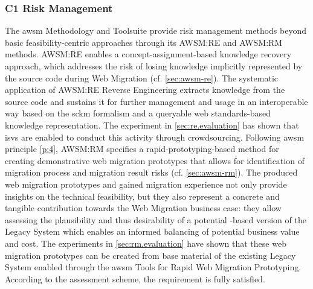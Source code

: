 \vspace{-10pt}
\subsubsection*{C1 Risk Management}
The \gls{awsm} Methodology and Toolsuite provide \gls{risk management} methods beyond basic feasibility-centric approaches through its AWSM:RE and AWSM:RM methods.
AWSM:RE enables a concept-assignment-based knowledge recovery approach, which addresses the risk of losing knowledge implicitly represented by the  source code during \gls{Web Migration} (cf. \cref{sec:awsm-re}).
The systematic application of AWSM:RE \gls{Reverse Engineering} extracts knowledge from the source code and sustains it for further management and usage in an interoperable way based on the \gls{sckm} formalism and a queryable \gls{web} standards-based knowledge representation.
The experiment in \cref{sec:re.evaluation} has shown that \glspl{isv} are enabled to conduct this activity through crowdsourcing.
Following \gls{awsm} principle \cref{p:4}, AWSM:RM specifies a rapid-prototyping-based method for creating demonstrative \glspl{web migration prototype} that allows for identification of migration process and migration result risks (cf. \cref{sec:awsm-rm}).
The produced \glspl{web migration prototype} and gained migration experience not only provide insights on the technical feasibility, but they also represent a concrete and tangible contribution towards the \gls{Web Migration} \gls{business case}: they allow assessing the plausibility and thus desirability of a potential -based version of the \gls{Legacy System} which enables an informed balancing of potential business value and cost.
The experiments in \cref{sec:rm.evaluation} have shown that these \glspl{web migration prototype} can be created from base material of the existing \gls{Legacy System} enabled through the \gls{awsm} Tools for \gls{Rapid Web Migration Prototyping}.
According to the assessment scheme, the requirement is fully satisfied.
\vspace{-10pt}

\vspace{-10pt}
